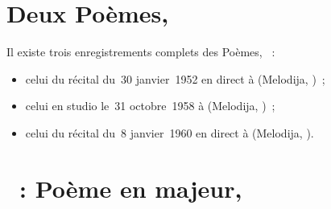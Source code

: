\section*{%
Deux Poèmes, }

Il existe trois enregistrements complets des Poèmes, ~:
\begin{itemize}
 \item
 celui du récital du~30 janvier~1952 en direct à \LPGH (Melodija, )~;
 \item
 celui en studio le~31 octobre~1958 à \Moscow (Melodija, )~;
 \item
 celui du récital du~8 janvier~1960 en direct à \MCSH (Melodija, ).
\end{itemize}

\section{\ifChrono \Scriabine{}~: \fi
Poème en \kF \Sharp majeur,  }
\label{\thesection}

